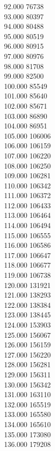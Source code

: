 { 92.000	76738 \\
 93.000	80397 \\
 94.000	80488 \\
 95.000	80519 \\
 96.000	80915 \\
 97.000	80976 \\
 98.000	81708 \\
 99.000	82500 \\
 100.000	85549 \\
 101.000	85640 \\
 102.000	85671 \\
 103.000	86890 \\
 104.000	86951 \\
 105.000	106006 \\
 106.000	106159 \\
 107.000	106220 \\
 108.000	106250 \\
 109.000	106281 \\
 110.000	106342 \\
 111.000	106372 \\
 112.000	106433 \\
 113.000	106464 \\
 114.000	106494 \\
 115.000	106555 \\
 116.000	106586 \\
 117.000	106647 \\
 118.000	106677 \\
 119.000	106738 \\
 120.000	131921 \\
 121.000	138293 \\
 122.000	138384 \\
 123.000	138445 \\
 124.000	153903 \\
 125.000	156067 \\
 126.000	156159 \\
 127.000	156220 \\
 128.000	156281 \\
 129.000	156311 \\
 130.000	156342 \\
 131.000	163110 \\
 132.000	165519 \\
 133.000	165580 \\
 134.000	165610 \\
 135.000	173080 \\
 136.000	179208 \\
}
